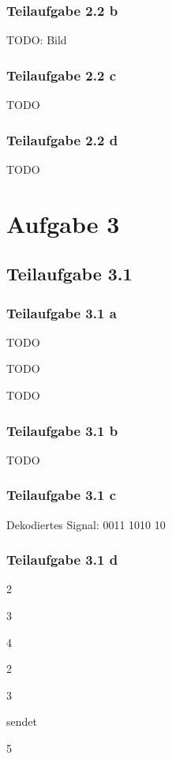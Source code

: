 \documentclass[a4paper]{scrartcl}
\begin{document}
  \subsubsection*{Teilaufgabe 2.2 b}
  TODO: Bild

  \subsubsection*{Teilaufgabe 2.2 c}
  TODO

  \subsubsection*{Teilaufgabe 2.2 d}
  TODO

  \section*{Aufgabe 3}
  \subsection*{Teilaufgabe 3.1}
  \subsubsection*{Teilaufgabe 3.1 a}
  \begin{enumerate*}[label=(\arabic*)]
      \item TODO
      \item TODO
      \item TODO
  \end{enumerate*}

  \subsubsection*{Teilaufgabe 3.1 b}
  TODO

  \subsubsection*{Teilaufgabe 3.1 c}
  Dekodiertes Signal: 0011 1010 10

  \subsubsection*{Teilaufgabe 3.1 d}
  \begin{enumerate*}[label=(l\arabic*)]
      \item 2
      \item 3
      \item 4
      \item 2
      \item 3
      \item sendet
      \item 5
  \end{enumerate*}
\end{document}
